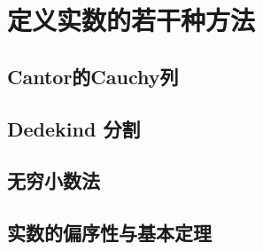 \section{定义实数的若干种方法}
\subsection{Cantor的Cauchy列}
\clearpage
\subsection{Dedekind 分割}
\clearpage
\subsection{无穷小数法}
\clearpage
\subsection{实数的偏序性与基本定理}
\clearpage
